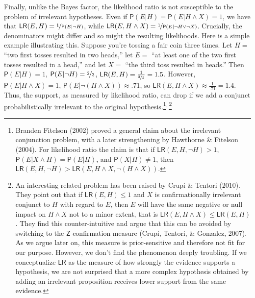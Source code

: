 \documentclass[
  10pt,
  dvipsnames,enabledeprecatedfontcommands]{scrartcl}
\newcommand{\n}{\neg}
\newcommand{\et}{\wedge}
\newcommand{\pr}[1]{\mathsf{P}(#1)}
\begin{document}
Finally, unlike the Bayes factor, the likelihood ratio is not
susceptible to the problem of irrelevant hypotheses. Even if
\(\pr{E\vert H} = \pr{E\vert H \et X} = 1\), we have that
\(\mathsf{LR}(E,H) = \nicefrac{1}{\pr{E \vert \n H}}\), while
\(\mathsf{LR}(E, H \et X) = \nicefrac{1}{\pr{E \vert \n H \vee \n X}}\).
Crucially, the denominators might differ and so might the resulting
likelihoods. Here is a simple example illustrating this. Suppose you're
tossing a fair coin three times. Let \(H=\) ``two first tosses resulted
in two heads,'' let \(E=\) ``at least one of the two first tosses
resulted in a head,'' and let \(X=\) ``the third toss resulted in
heads.'' Then \(\pr{E \vert H} =1\),
\(\pr{E\vert \n H} = \nicefrac{2}{3}\),
\(\mathsf{LR}(E,H) = \frac{1}{\nicefrac{2}{3}} = 1.5\). However,
\(\pr{E\vert H \et X} =1\), \(\pr{E \vert \n (H \et X)} \approx .71\),
so \(\mathsf{LR}(E,H \et X) \approx \frac{1}{.71} = 1.4\). Thus, the
support, as measured by likelihood ratio, can drop if we add a conjunct
probabilistically irrelevant to the original
hypothesis.\footnote{Branden Fitelson (2002) proved a general claim
  about the irrelevant conjunction problem, with a later strengthening
  by Hawthorne \& Fitelson (2004). For likelihood ratio the claim is
  that if \(\mathsf{LR}(E,H,\n H)>1\),
  \(\pr{E \vert X \et H} = \pr{E \vert H}\), and
  \(\pr{X \vert H} \neq 1\), then
  \(\mathsf{LR}(E,H,\n H) > \mathsf{LR}(E,H \et X,\n(H \et X))\).}\(^,\,\)\footnote{An
  interesting related problem has been raised by Crupi \& Tentori
  (2010). They point out that if \(\mathsf{LR}(E,H)\leq 1\) and \(X\) is
  confirmationally irrelevant conjunct to \(H\) with regard to \(E\),
  then \(E\) will have the same negative or null impact on \(H \et X\)
  not to a minor extent, that is
  \(\mathsf{LR}(E,H \et X ) \leq \mathsf{LR}(E,H)\). They find this
  counter-intuitive and argue that this can be avoided by switching to
  the \(\mathsf{Z}\) confirmation measure (Crupi, Tentori, \& Gonzalez,
  2007). As we argue later on, this measure is prior-sensitive and
  therefore not fit for our purpose. However, we don't find the
  phenomenon deeply troubling. If we conceptualize \(\mathsf{LR}\) as
  the measure of how strongly the evidence supports a hypothesis, we are
  not surprised that a more complex hypothesis obtained by adding an
  irrelevant proposition receives lower support from the same evidence.}

\vspace{1mm}
\footnotesize

\normalsize
\end{document}
